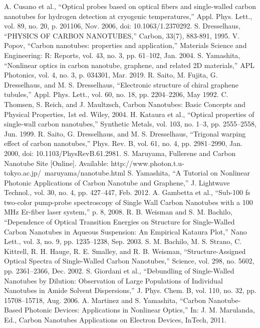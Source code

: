 \begin{thebibliography}{99}
A. Cusano et al., “Optical probes based on optical fibers and single-walled carbon nanotubes for hydrogen detection at cryogenic temperatures,” Appl. Phys. Lett., vol. 89, no. 20, p. 201106, Nov. 2006, doi: 10.1063/1.2370292.
 S. Dresselhaus, “PHYSICS OF CARBON NANOTUBES,” Carbon, 33(7), 883-891, 1995.
 V. Popov, “Carbon nanotubes: properties and application,” Materials Science and Engineering: R: Reports, vol. 43, no. 3, pp. 61–102, Jan. 2004.
 S. Yamashita, “Nonlinear optics in carbon nanotube, graphene, and related 2D materials,” APL Photonics, vol. 4, no. 3, p. 034301, Mar. 2019.
R. Saito, M. Fujita, G. Dresselhaus, and M. S. Dresselhaus, “Electronic structure of chiral graphene tubules,” Appl. Phys. Lett., vol. 60, no. 18, pp. 2204–2206, May 1992.
C. Thomsen, S. Reich, and J. Maultzsch, Carbon Nanotubes: Basic Concepts and Physical Properties, 1st ed. Wiley, 2004. 
 H. Kataura et al., “Optical properties of single-wall carbon nanotubes,” Synthetic Metals, vol. 103, no. 1–3, pp. 2555–2558, Jun. 1999.
 R. Saito, G. Dresselhaus, and M. S. Dresselhaus, “Trigonal warping effect of carbon nanotubes,” Phys. Rev. B, vol. 61, no. 4, pp. 2981–2990, Jan. 2000, doi: 10.1103/PhysRevB.61.2981.
 S. Maruyama, Fullerene and Carbon Nanotube Site [Online]. Available: http://www.photon.t.u-tokyo.ac.jp/~maruyama/nanotube.html
 S. Yamashita, “A Tutorial on Nonlinear Photonic Applications of Carbon Nanotube and Graphene,” J. Lightwave Technol., vol. 30, no. 4, pp. 427–447, Feb. 2012.
A. Gambetta et al., “Sub-100 fs two-color pump-probe spectroscopy of Single Wall Carbon Nanotubes with a 100 MHz Er-fiber laser system,” p. 8, 2008.
 R. B. Weisman and S. M. Bachilo, “Dependence of Optical Transition Energies on Structure for Single-Walled Carbon Nanotubes in Aqueous Suspension: An Empirical Kataura Plot,” Nano Lett., vol. 3, no. 9, pp. 1235–1238, Sep. 2003.
 S. M. Bachilo, M. S. Strano, C. Kittrell, R. H. Hauge, R. E. Smalley, and R. B. Weisman, “Structure-Assigned Optical Spectra of Single-Walled Carbon Nanotubes,” Science, vol. 298, no. 5602, pp. 2361–2366, Dec. 2002. 
S. Giordani et al., “Debundling of Single-Walled Nanotubes by Dilution: Observation of Large Populations of Individual Nanotubes in Amide Solvent Dispersions,” J. Phys. Chem. B, vol. 110, no. 32, pp. 15708–15718, Aug. 2006.
 A. Martinez and S. Yamashita, “Carbon Nanotube-Based Photonic Devices: Applications in Nonlinear Optics,” In: J. M. Marulanda, Ed., Carbon Nanotubes Applications on Electron Devices, InTech, 2011. 

\end{thebibliography}
